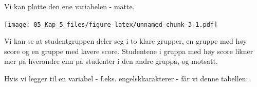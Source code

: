 \documentclass[
]{article}
\newenvironment{Shaded}{\begin{snugshade}}{\end{snugshade}}
\newcommand{\AttributeTok}[1]{\textcolor[rgb]{0.77,0.63,0.00}{#1}}
\newcommand{\CommentTok}[1]{\textcolor[rgb]{0.56,0.35,0.01}{\textit{#1}}}
\newcommand{\FunctionTok}[1]{\textcolor[rgb]{0.00,0.00,0.00}{#1}}
\newcommand{\NormalTok}[1]{#1}
\newcommand{\SpecialCharTok}[1]{\textcolor[rgb]{0.00,0.00,0.00}{#1}}
\newcommand{\StringTok}[1]{\textcolor[rgb]{0.31,0.60,0.02}{#1}}
\begin{document}
Vi kan plotte den ene variabelen - matte.

\begin{Shaded}
\end{Shaded}

\texttt{[image: 05\_Kap\_5\_files/figure-latex/unnamed-chunk-3-1.pdf]}

Vi kan se at studentgruppen deler seg i to klare grupper, en gruppe med høy score og en gruppe med lavere score. Studentene i gruppa med høy score likner mer på hverandre enn på studenter i den andre gruppa, og motsatt.

Hvis vi legger til en variabel - f.eks. engelskkarakterer - får vi denne tabellen:

\providecommand{\docline}[3]{\noalign{\global\setlength{\arrayrulewidth}{#1}}\arrayrulecolor[HTML]{#2}\cline{#3}}

\setlength{\tabcolsep}{2pt}

\renewcommand*{\arraystretch}{1.5}
\end{document}
